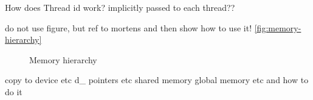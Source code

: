 How does Thread id work? implicitly passed to each thread??

do not use figure, but ref to mortens and then show how to use it!
\autoref{fig:memory-hierarchy}

\begin{figure}[ht]
	\centering
	\caption{Memory hierarchy}
	\label{fig:memory-hierarchy}
\end{figure}


copy to device etc
d\_ pointers etc
shared memory
global memory etc and how to do it

